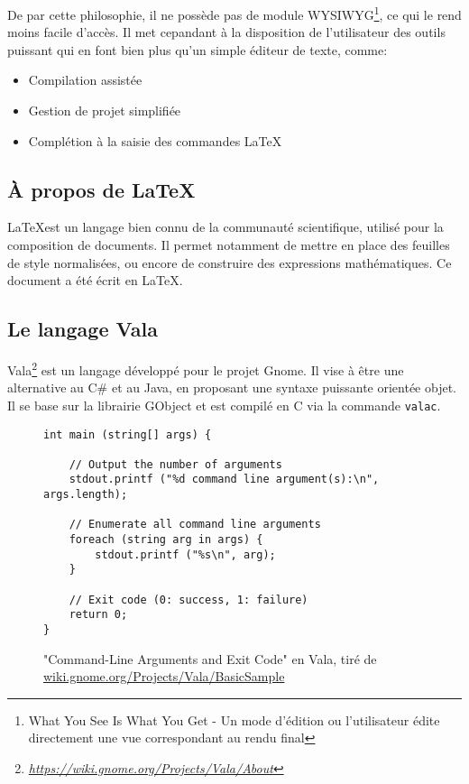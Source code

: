 \documentclass[a4paper,11pt]{report}
\begin{document}
De par cette philosophie, il ne possède pas de module WYSIWYG\footnote{What You See Is What You Get - Un mode d'édition ou l'utilisateur édite directement une vue correspondant au rendu final}, ce qui le rend moins facile d'accès.
Il met cepandant à la disposition de l'utilisateur des outils puissant qui en font bien plus qu'un simple éditeur de texte, comme:

\begin{itemize}
	\item Compilation assistée
	\item Gestion de projet simplifiée
	\item Complétion à la saisie des commandes \LaTeX
\end{itemize}
\newpage

\subsection{À propos de \LaTeX}
\LaTeX  est un langage bien connu de la communauté scientifique, utilisé pour la composition de documents.
Il permet notamment de mettre en place des feuilles de style normalisées, ou encore de construire des expressions mathématiques.
Ce document a été écrit en \LaTeX.

\subsection{Le langage Vala}
\label{sub:vala}
Vala\footnote{\textit{\url{https://wiki.gnome.org/Projects/Vala/About}}} est un langage développé pour le projet Gnome.
Il vise à être une alternative au C\# et au Java, en proposant une syntaxe puissante orientée objet.
Il se base sur la librairie GObject et est compilé en C via la commande \texttt{valac}.

\begin{figure}[h] %
\begin{lstlisting}
int main (string[] args) {

    // Output the number of arguments
    stdout.printf ("%d command line argument(s):\n", args.length);

    // Enumerate all command line arguments
    foreach (string arg in args) {
        stdout.printf ("%s\n", arg);
    }

    // Exit code (0: success, 1: failure)
    return 0;
}
\end{lstlisting}
\caption{"Command-Line Arguments and Exit Code" en Vala, tiré de \url{wiki.gnome.org/Projects/Vala/BasicSample}}
\end{figure}
\end{document}
